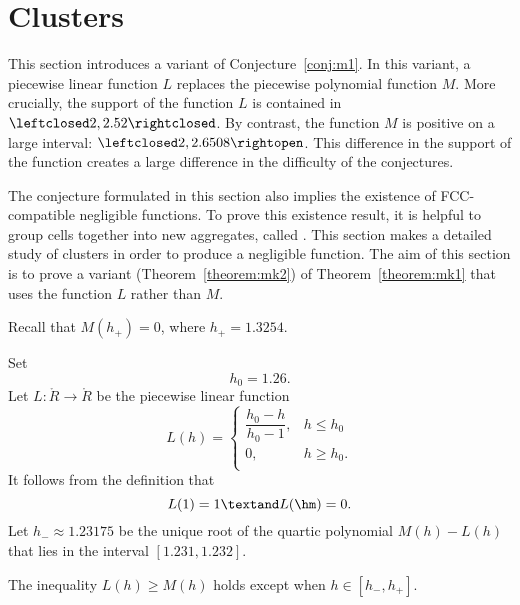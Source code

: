 \section{Clusters}

This section introduces a variant of 
Conjecture~\ref{conj:m1}.  In this variant, a piecewise linear
function $L$ replaces the piecewise polynomial function $M$.  More
crucially, the support of the function $L$ is contained in
$\leftclosed2,2.52\rightclosed$.  By contrast, the function $M$ is
positive on a large interval: $\leftclosed2,2.6508\rightopen$.  This
difference in the support of the function creates a large difference
in the difficulty of the conjectures.

The conjecture formulated in this section also implies the existence
of FCC-compatible negligible functions.  To prove this existence
result, it is helpful to group cells together into new
aggregates, called .  This section makes a detailed
study of clusters in order to produce a negligible function.
The aim of this section is to prove a variant
(Theorem~\ref{theorem:mk2}) of Theorem~\ref{theorem:mk1} that uses the
function $L$ rather than $M$.


Recall that $M(h_+) = 0$, where   $h_+ = 1.3254$.
%

\begin{definition}[$L$,~$h_0$,~$h_-$]\label{def:L} 
Set
\[  
h_0 = 1.26.%
\] 
Let $L:\ring{R}\to\ring{R}$ be the piecewise linear function 
\[  
L(h) = \begin{cases} 
\dfrac{h_0-h}{h_0-1}, & h \le h_0 \\
0, & h\ge h_0. \\
\end{cases}
\] 
It follows from the definition that
\[  
L(1) = 1\textand  L(\hm) = 0.
\] 
Let $h_- \approx 1.23175$ be the unique root of the quartic polynomial
$M(h)-L(h)$ that lies in the interval $[1.231,1.232]$.
%
%
%
\end{definition}

The inequality $L(h)\ge M(h)$ holds except when $h\in [h_-,h_+]$.

\figBJLIEKB %

